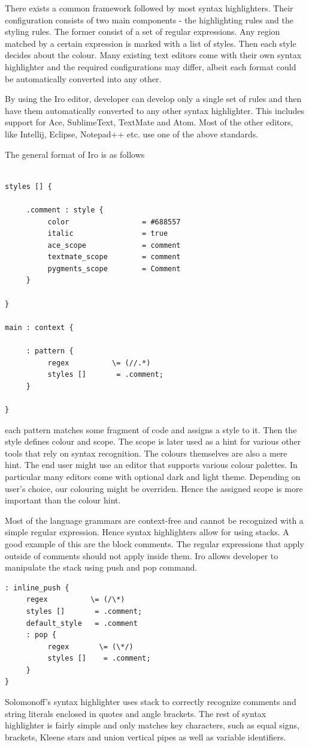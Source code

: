 There exists a common framework followed by most syntax highlighters. Their configuration consists of two main components - the highlighting rules and the styling rules. The former consist of a set of regular expressions. Any region matched by a certain expression is marked with a list of styles. Then each style decides about the colour. Many existing text editors come with their own syntax highlighter and the required configurations may differ, albeit each format could be automatically converted into any other. 

By using the Iro editor, developer can develop only a single set of rules and then have them automatically converted to any other syntax highlighter. This includes support for Ace, SublimeText, TextMate and Atom. Most of the other editors, like Intellij, Eclipse, Notepad++ etc. use one of the above standards. 

The general format of Iro is as follows
\begin{lstlisting}

styles [] {
     
     .comment : style {
          color                 = #688557
          italic                = true
          ace_scope             = comment
          textmate_scope        = comment
          pygments_scope        = Comment
     }
 
}

main : context {
     
     : pattern {
          regex          \= (//.*)
          styles []       = .comment;
     }
 
}
\end{lstlisting}
each pattern matches some fragment of code and assigns a style to it. Then the style defines colour and scope. The scope is later used as a hint for various other tools that rely on syntax recognition. The colours themselves are also a mere hint. The end user might use an editor that supports various colour palettes. In particular many editors come with optional dark and light theme. Depending on user's choice, our colouring might be overriden. Hence the assigned scope is more important than the colour hint.

Most of the language grammars are context-free and cannot be recognized with a simple regular expression. Hence syntax highlighters allow for using stacks. A good example of this are the block comments. The regular expressions that apply outside of comments should not apply inside them. Iro allows developer to manipulate the stack using push and pop command.
\begin{lstlisting}
: inline_push {
     regex          \= (/\*)
     styles []       = .comment;
     default_style   = .comment
     : pop {
          regex       \= (\*/)
          styles []    = .comment;
     }
}
\end{lstlisting}
Solomonoff's syntax highlighter uses stack to correctly recognize comments and string literals enclosed in quotes and angle brackets. The rest of syntax highlighter is fairly simple and only matches key characters, such as equal signs, brackets, Kleene stars and union vertical pipes as well as variable identifiers.

